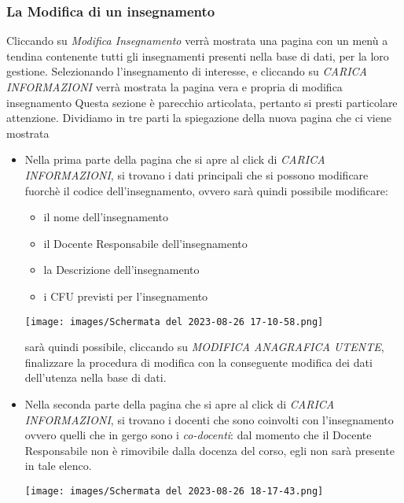 \documentclass{article}
\begin{document}
    \subsubsection{La Modifica di un insegnamento}
    Cliccando su \textit{Modifica Insegnamento} verrà mostrata una pagina con un menù a tendina contenente tutti gli insegnamenti presenti nella base di dati, per la loro gestione. Selezionando l'insegnamento di interesse, e cliccando su \textit{CARICA INFORMAZIONI} verrà mostrata la pagina vera e propria di modifica insegnamento
    Questa sezione è parecchio articolata, pertanto si presti particolare attenzione.
    Dividiamo in tre parti la spiegazione della nuova pagina che ci viene mostrata
    \begin{itemize}
        \item Nella prima parte della pagina che si apre al click di \textit{CARICA INFORMAZIONI}, si trovano i dati principali che si possono modificare fuorchè il codice dell'insegnamento, ovvero sarà quindi possibile modificare:
        \begin{itemize}
            \item il nome dell'insegnamento
            \item il Docente Responsabile dell'insegnamento
            \item la Descrizione dell'insegnamento
            \item i CFU previsti per l'insegnamento
        \end{itemize}

        \begin{center}
            \texttt{[image: images/Schermata del 2023-08-26 17-10-58.png]}
        \end{center}

        sarà quindi possibile, cliccando su \textit{MODIFICA ANAGRAFICA UTENTE}, finalizzare la procedura di modifica con la conseguente modifica dei dati dell'utenza nella base di dati.

        \item Nella seconda parte della pagina che si apre al click di \textit{CARICA INFORMAZIONI}, si trovano i docenti che sono coinvolti con l'insegnamento ovvero quelli che in gergo sono i \textit{co-docenti}: dal momento che il Docente Responsabile non è rimovibile dalla docenza del corso, egli non sarà presente in tale elenco.

        \begin{center}
            \texttt{[image: images/Schermata del 2023-08-26 18-17-43.png]}
        \end{center}


\end{itemize}
\end{document}
